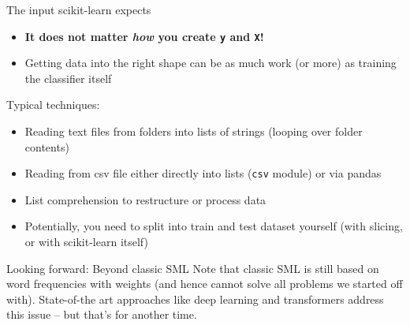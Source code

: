 \begin{frame}{The input scikit-learn expects}
  \begin{itemize}
  \item \textbf{It does not matter \emph{how} you create \texttt{y} and \texttt{X}!}
  \item Getting data into the right shape can be as much work (or more) as training the classifier itself
  \end{itemize}
  \pause
  Typical techniques:
  \begin{itemize}
  \item Reading text files from folders into lists of strings (looping over folder contents)
  \item Reading from csv file either directly into lists (\texttt{csv} module) or via pandas
  \item List comprehension to restructure or process data
  \item Potentially, you need to split into train and test dataset yourself (with slicing, or  with scikit-learn itself)
  \end{itemize}
\end{frame}






\begin{frame}{Looking forward: Beyond classic SML}
Note that classic SML is still based on word frequencies with weights (and hence cannot solve all problems we started off with). State-of-the art approaches like deep learning and transformers address this issue -- but that's for another time.
  
\end{frame}



